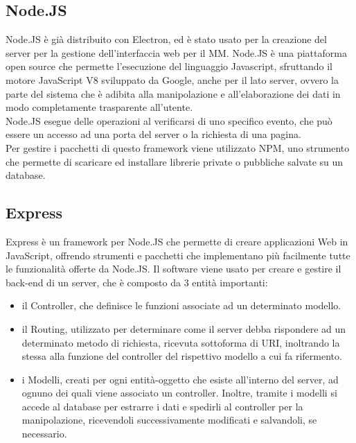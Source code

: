 \subsection{Node.JS}
Node.JS è gi\`a distribuito con Electron, ed \`e stato usato per la creazione del server
per la gestione dell'interfaccia web per il MM.
Node.JS \`e una piattaforma open source che permette l'esecuzione del linguaggio Javascript, sfruttando il motore JavaScript V8 sviluppato da Google,
anche per il lato server, ovvero
la parte del sistema che \`e adibita alla manipolazione e all'elaborazione
dei dati in modo completamente trasparente all'utente.\\
Node.JS esegue delle operazioni al verificarsi di uno specifico evento, che pu\`o essere un accesso ad una porta
del server o la richiesta di una pagina.\\
Per gestire i pacchetti di questo framework viene utilizzato NPM\cite{NPM}, uno strumento che permette
di scaricare ed installare librerie private o pubbliche salvate su un database.
\\[1\baselineskip]

\subsection{Express}\label{cap:express}
Express \`e un framework per Node.JS che permette di creare applicazioni Web in JavaScript, offrendo strumenti e pacchetti
che implementano pi\`u facilmente tutte le funzionalit\`a offerte da Node.JS.
Il software viene usato per creare e gestire il back-end di un server, che \`e composto da 3 entit\`a importanti:
\begin{itemize}
\item il Controller, che definisce le funzioni associate ad un determinato modello.
\item il Routing, utilizzato per determinare come il server debba rispondere ad un determinato metodo di richiesta,
ricevuta sottoforma di URI, inoltrando la stessa alla funzione del controller del rispettivo modello a cui fa rifermento.
\item i Modelli, creati per ogni entit\`a-oggetto che esiste all'interno del server, ad ognuno dei quali viene associato
un controller. Inoltre, tramite i modelli si accede al database per estrarre i dati e spedirli al controller per
la manipolazione, ricevendoli successivamente modificati e salvandoli, se necessario.
\\[2\baselineskip]
\end{itemize}

